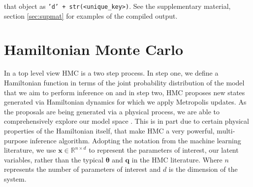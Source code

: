 \documentclass[twoside]{article}
\begin{document}
that object as \texttt{'d' + str(<unique_key>)}. See the supplementary material, section \ref{sec:supmat} for examples of the compiled output.  \\
 

\section{Hamiltonian Monte Carlo}
\label{sec:hmc}
In a top level view HMC is a two step process. In step one, we define a Hamiltonian function in terms of the joint probability distribution of the model that we aim to perform inference on and in step two, HMC proposes new states generated via Hamiltonian dynamics for which we apply Metropolis updates. As the proposals are being generated via a physical process, we are able to comprehensively explore our model space \citep{neal2011mcmc}. This is in part due to certain physical properties of the Hamiltonian itself, that make HMC a very powerful, multi-purpose inference algorithm. Adopting the notation from the machine learning literature, we use $\textbf{x} \in \mathbb{R}^{n \times d}$ to represent the parameters of interest, our latent variables, rather than the typical $\mathbf{\theta}$ and $\textbf{q}$ in the HMC literature. Where $n$ represents the number of parameters of interest and $d$ is the dimension of the system.
\end{document}
